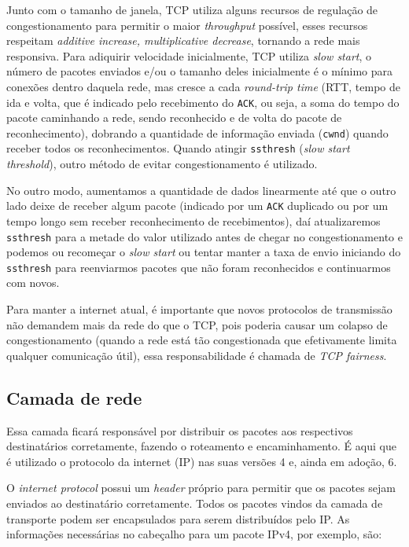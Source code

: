 \documentclass[brazilian,a4paper,twocolumn]{article}
\begin{document}
Junto com o tamanho de janela, TCP utiliza alguns recursos de regulação de congestionamento para permitir o maior \textit{throughput} possível, esses recursos respeitam \textit{additive increase, multiplicative decrease}, tornando a rede mais responsiva. Para adiquirir velocidade inicialmente, TCP utiliza \textit{slow start}, o número de pacotes enviados e/ou o tamanho deles inicialmente é o mínimo para conexões dentro daquela rede, mas cresce a cada \textit{round-trip time} (RTT, tempo de ida e volta, que é indicado pelo recebimento do \texttt{ACK}, ou seja, a soma do tempo do pacote caminhando a rede, sendo reconhecido e de volta do pacote de reconhecimento), dobrando a quantidade de informação enviada (\texttt{cwnd}) quando receber todos os reconhecimentos. Quando atingir \texttt{ssthresh} (\textit{slow start threshold}), outro método de evitar congestionamento é utilizado.

No outro modo, aumentamos a quantidade de dados linearmente até que o outro lado deixe de receber algum pacote (indicado por um \texttt{ACK} duplicado ou por um tempo longo sem receber reconhecimento de recebimentos), daí atualizaremos \texttt{ssthresh} para a metade do valor utilizado antes de chegar no congestionamento e podemos ou recomeçar o \textit{slow start} ou tentar manter a taxa de envio iniciando do \texttt{ssthresh} para reenviarmos pacotes que não foram reconhecidos e continuarmos com novos.

Para manter a internet atual, é importante que novos protocolos de transmissão não demandem mais da rede do que o TCP, pois poderia causar um colapso de congestionamento (quando a rede está tão congestionada que efetivamente limita qualquer comunicação útil), essa responsabilidade é chamada de \textit{TCP fairness}.


\subsection{Camada de rede}

Essa camada ficará responsável por distribuir os pacotes aos respectivos destinatários corretamente, fazendo o roteamento e encaminhamento. É aqui que é utilizado o protocolo da internet (IP) nas suas versões 4 e, ainda em adoção, 6.

O \textit{internet protocol} possui um \textit{header} próprio para permitir que os pacotes sejam enviados ao destinatário corretamente. Todos os pacotes vindos da camada de transporte podem ser encapsulados para serem distribuídos pelo IP. As informações necessárias no cabeçalho para um pacote IPv4, por exemplo, são:
\end{document}
